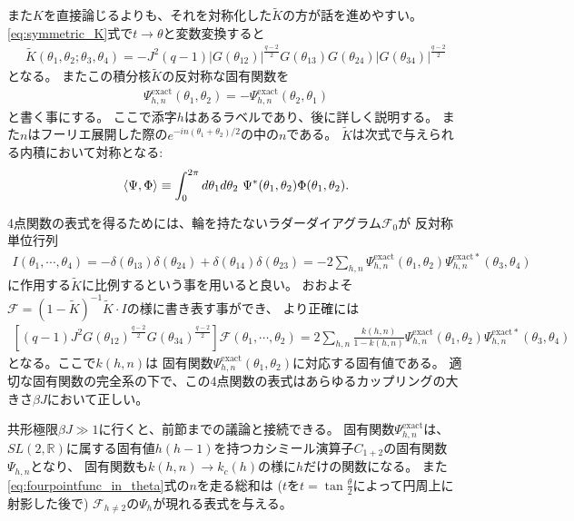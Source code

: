 また$K$を直接論じるよりも、それを対称化した$\tilde{K}$の方が話を進めやすい。
\eqref{eq:symmetric_K}式で$t\to\theta$と変数変換すると
\begin{align}
	\tilde{K}(\theta_1, \theta_2; \theta_3, \theta_4)
	= -J^2(q-1)
		|G(\theta_{12})|^{\frac{q-2}{2}}
		G(\theta_{13})G(\theta_{24})
		|G(\theta_{34})|^{\frac{q-2}{2}}
\end{align}
となる。
またこの積分核$\tilde{K}$の反対称な固有関数を
\begin{align}
	\Psi_{h,n}^{\mathrm{exact}}(\theta_1, \theta_2)
	= - \Psi_{h,n}^{\mathrm{exact}}(\theta_2, \theta_1)
\end{align}
と書く事にする。
ここで添字$h$はあるラベルであり、後に詳しく説明する。
また$n$はフーリエ展開した際の$e^{-in(\theta_1 + \theta_2)/2}$の中の$n$である。
$\tilde{K}$は次式で与えられる内積において対称となる:
\begin{align}
	\langle \Psi, \Phi \rangle \equiv
	\int_0^{2\pi}d\theta_1d\theta_2\ \Psi^*(\theta_1, \theta_2)\Phi(\theta_1, \theta_2).
\end{align}

4点関数の表式を得るためには、輪を持たないラダーダイアグラム$\mathcal{F}_0$が
反対称単位行列
\begin{align}
	I(\theta_1, \cdots, \theta_4)
	= -\delta(\theta_{13})\delta(\theta_{24}) + \delta(\theta_{14})\delta(\theta_{23})
	= -2\sum_{h,n}\Psi_{h,n}^{\mathrm{exact}}(\theta_1, \theta_2)
		\Psi_{h,n}^{\mathrm{exact}*}(\theta_3, \theta_4)
\end{align}
に作用する$\tilde{K}$に比例するという事を用いると良い。
おおよそ$\mathcal{F} = (1 - \tilde{K})^{-1}\tilde{K}\cdot I$の様に書き表す事ができ、
より正確には
\begin{align}
	\left[(q-1)J^2G(\theta_{12})^{\frac{q-2}{2}}G(\theta_{34})^{\frac{q-2}{2}}\right]
	\mathcal{F}(\theta_1,\cdots,\theta_2) = 
	2\sum_{h,n}\frac{k(h,n)}{1-k(h,n)}
		\Psi_{h,n}^{\mathrm{exact}}(\theta_1, \theta_2)
		\Psi_{h,n}^{\mathrm{exact}*}(\theta_3, \theta_4)
	\label{eq:fourpointfunc_in_theta}
\end{align}
となる。ここで$k(h,n)$は
固有関数$\Psi_{h,n}^{\mathrm{exact}}(\theta_1, \theta_2)$に対応する固有値である。
適切な固有関数の完全系の下で、この4点関数の表式はあらゆるカップリングの大きさ$\beta J$において正しい。

共形極限$\beta J \gg 1$に行くと、前節までの議論と接続できる。
固有関数$\Psi_{h,n}^{\mathrm{exact}}$は、
$SL(2,\mathbb{R})$に属する固有値$h(h-1)$を持つカシミール演算子$C_{1+2}$の固有関数$\Psi_{h,n}$となり、
固有関数も$k(h,n)\to k_c(h)$の様に$h$だけの関数になる。
また\eqref{eq:fourpointfunc_in_theta}式の$n$を走る総和は
($t$を$t = \tan\frac{\theta}{2}$によって円周上に射影した後で)
$\mathcal{F}_{h\neq 2}$の$\Psi_h$が現れる表式を与える。


